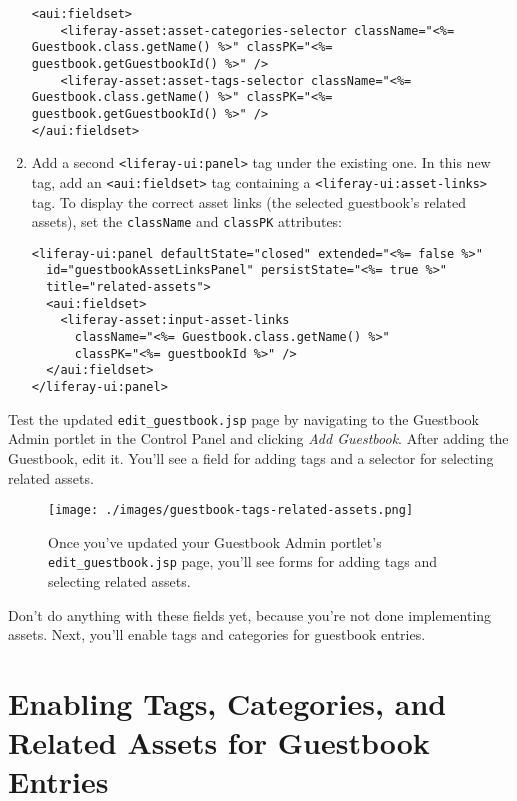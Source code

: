 \begin{enumerate}
\begin{verbatim}
<aui:fieldset>
    <liferay-asset:asset-categories-selector className="<%= Guestbook.class.getName() %>" classPK="<%= guestbook.getGuestbookId() %>" />
    <liferay-asset:asset-tags-selector className="<%= Guestbook.class.getName() %>" classPK="<%= guestbook.getGuestbookId() %>" />
</aui:fieldset>
\end{verbatim}
\item
  Add a second \texttt{\textless{}liferay-ui:panel\textgreater{}} tag
  under the existing one. In this new tag, add an
  \texttt{\textless{}aui:fieldset\textgreater{}} tag containing a
  \texttt{\textless{}liferay-ui:asset-links\textgreater{}} tag. To
  display the correct asset links (the selected guestbook's related
  assets), set the \texttt{className} and \texttt{classPK} attributes:

\begin{verbatim}
<liferay-ui:panel defaultState="closed" extended="<%= false %>"
  id="guestbookAssetLinksPanel" persistState="<%= true %>"
  title="related-assets">
  <aui:fieldset>
    <liferay-asset:input-asset-links
      className="<%= Guestbook.class.getName() %>"
      classPK="<%= guestbookId %>" />
  </aui:fieldset>
</liferay-ui:panel>
\end{verbatim}
\end{enumerate}

Test the updated \texttt{edit\_guestbook.jsp} page by navigating to the
Guestbook Admin portlet in the Control Panel and clicking \emph{Add
Guestbook}. After adding the Guestbook, edit it. You'll see a field for
adding tags and a selector for selecting related assets.

\begin{figure}
\centering
\texttt{[image: ./images/guestbook-tags-related-assets.png]}
\caption{Once you've updated your Guestbook Admin portlet's
\texttt{edit\_guestbook.jsp} page, you'll see forms for adding tags and
selecting related assets.}
\end{figure}

Don't do anything with these fields yet, because you're not done
implementing assets. Next, you'll enable tags and categories for
guestbook entries.

\chapter{Enabling Tags, Categories, and Related Assets for Guestbook
Entries}\label{enabling-tags-categories-and-related-assets-for-guestbook-entries}

